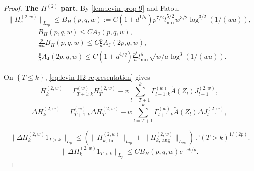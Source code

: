 \begin{proof}
\textbf{The $H^{(2)}$ part.} By \cref{lem:levin-prop-9} and Fatou,
\begin{equation}
\lVert H_{s}^{(2,w)} \rVert_{L_{2p}}
  \le B_{H}(p,q,w)
  := C (1 + d^{1 / q}) p^{7 / 2} t_{\mathrm{mix}}^{5 / 2}
        w^{3 / 2} \log^{3 / 2}(1 / (w a)),
\label{eq:burn-H2-one-trajectory-scale}
\end{equation}
\begin{equation}
\begin{aligned}
&B_{H}(p,q,w) \le C A_{\mathrm{J}}(p,q,w), \\
&\frac{p}{w a} B_{H}(p,q,w)
  \le C \frac{p}{a} A_{\mathrm{J}}(2p,q,w), \\
&\frac{p}{a} A_{\mathrm{J}}(2p,q,w)
  \le C (1 + d^{1 / q}) \frac{p^{8}}{a}
     t_{\mathrm{mix}}^{5} \sqrt{w / a} \log^{3}(1 / (w a)).
\end{aligned}
\label{eq:burn-startup-scale-audit}
\end{equation}

On $\left\{ T \le k \right\}$, \eqref{eq:levin-H2-representation} gives
\[
H_{k}^{(2,w)}
  = \Gamma_{T + 1:k}^{(w)} H_{T}^{(2,w)}
    - w \sum_{l = T + 1}^{k} \Gamma_{l + 1:k}^{(w)}
        \tilde{A}(Z_{l}) J_{l - 1}^{(2,w)},
\]
\begin{equation}
\Delta H_{k}^{(2,w)}
  = \Gamma_{T + 1:k}^{(w)} \Delta H_{T}^{(2,w)}
    - w \sum_{l = T + 1}^{k} \Gamma_{l + 1:k}^{(w)}
        \tilde{A}(Z_{l}) \Delta J_{l - 1}^{(2,w)},
\label{eq:burn-H2-coupled-diff}
\end{equation}

\[
\lVert \Delta H_{k}^{(2,w)} 1_{T > k} \rVert_{L_{p}}
  \le \left( \lVert H_{k, \operatorname{fin}}^{(2,w)} \rVert_{L_{2p}}
       + \lVert H_{k, \operatorname{aug}}^{(2,w)} \rVert_{L_{2p}} \right) \, \mathbb{P}(T > k)^{1 / (2p)}.
\]
\begin{equation}
\lVert \Delta H_{k}^{(2,w)} 1_{T > k} \rVert_{L_{p}}
  \le C B_{H}(p,q,w)
       e^{-c k / p}.
\label{eq:burn-H2-bad-event}
\end{equation}


\end{proof}
